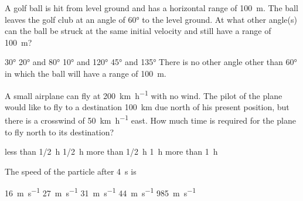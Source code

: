 \documentclass{../../../oss-ap12ibhl}
\begin{document}
\begin{questions}
  \uplevel{\rule{\linewidth}{.6pt}}
  
  \question A golf ball is hit from level ground and has a horizontal range of
  \SI{100}{\metre}. The ball leaves the golf club at an angle of \ang{60} to
  the level ground. At what other angle(s) can the ball be struck at the same
  initial velocity and still have a range of \SI{100}{\metre}?

  \begin{minipage}{.38\linewidth}
  \end{minipage}
  \begin{minipage}{.61\linewidth}
    \begin{choices}
      \choice\ang{30}
      \choice\ang{20} and \ang{80}
      \choice\ang{10} and \ang{120}
      \choice\ang{45} and \ang{135}
      \choice There is no other angle other than \ang{60} in which the ball
      will have a range of \SI{100}{\metre}.
    \end{choices}
  \end{minipage}

  \uplevel{\rule{\linewidth}{.6pt}}
  
  \question A small airplane can fly at \SI{200}{\kilo\metre\per\hour} with no
  wind. The pilot of the plane would like to fly to a destination
  \SI{100}{\kilo\metre} due north of his present position, but there is a
  crosswind of \SI{50}{\kilo\metre\per\hour} east. How much time is required
  for the plane to fly north to its destination?
  \begin{choices}
    \choice less than \SI{1/2}{\hour}
    \choice \SI{1/2}{\hour}
    \choice more than \SI{1/2}{\hour}
    \choice \SI{1}{\hour}
    \choice more than \SI{1}{\hour}
  \end{choices}
  \newpage
  

  \question The speed of the particle after \SI{4}{\second} is

  \begin{oneparchoices}
    \choice\SI{16}{\metre\per\second}\hspace{.27in}
    \choice\SI{27}{\metre\per\second}\hspace{.27in}
    \choice\SI{31}{\metre\per\second}\hspace{.27in}
    \choice\SI{44}{\metre\per\second}\hspace{.27in}
    \choice\SI{985}{\metre\per\second}
  \end{oneparchoices}
  \label{q:particle1}
  \vspace{.3in}
    

\end{questions}
\end{document}
